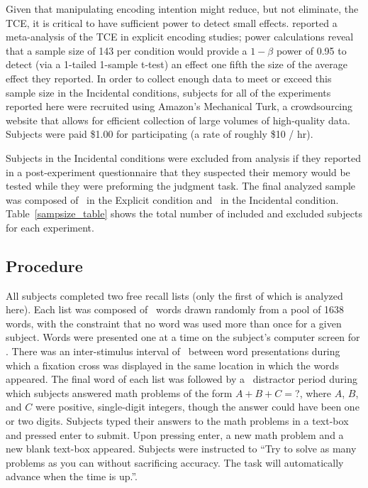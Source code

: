 \documentclass[jou,natbib]{apa6} %
\begin{document}
Given that manipulating encoding intention might reduce, but not eliminate, the TCE, it is critical to have sufficient power to detect small effects. \citet{SedeEtal10} reported a meta-analysis of the TCE in explicit encoding studies; power calculations reveal that a sample size of 143 per condition would provide a $1-\beta$ power of 0.95 to detect (via a 1-tailed 1-sample t-test) an effect one fifth the size of the average effect they reported. 
In order to collect enough data to meet or exceed this sample size in the Incidental conditions, subjects for all of the experiments reported here were recruited using Amazon's Mechanical Turk, a crowdsourcing website that allows for efficient collection of large volumes of high-quality data. Subjects were paid \$1.00 for participating (a rate of roughly \$10 / hr).

Subjects in the Incidental conditions were excluded from analysis if they reported in a post-experiment questionnaire that they suspected their memory would be tested while they were preforming the judgment task. The final analyzed sample was composed of \shoeExplicitIncluded~in the Explicit condition and \shoeIncidentalIncluded~in the Incidental condition. Table~\ref{sampsize_table} shows the total number of included and excluded subjects for each experiment.
 





\subsection{Procedure}
All subjects completed two free recall lists (only the first of which is analyzed here). Each list was composed of \listlength~words drawn randomly from a pool of 1638 words, with the constraint that no word was used more than once for a given subject. Words were presented one at a time on the subject's computer screen for \presrate. 
There was an inter-stimulus interval of \isi~between word presentations during which a fixation cross was displayed in the same location in which the words appeared. The final word of each list was followed by a \DFRDelay~distractor period during which subjects answered math problems of the form $A+B+C=$?, where $A$, $B$, and $C$ were positive, single-digit integers, though the answer could have been one or two digits. Subjects typed their answers to the math problems in a text-box and pressed enter to submit. Upon pressing enter, a new math problem and a new blank text-box appeared. Subjects were instructed to ``Try to solve as many problems as you can without sacrificing accuracy. The task will automatically advance when the time is up.''.
\end{document}

